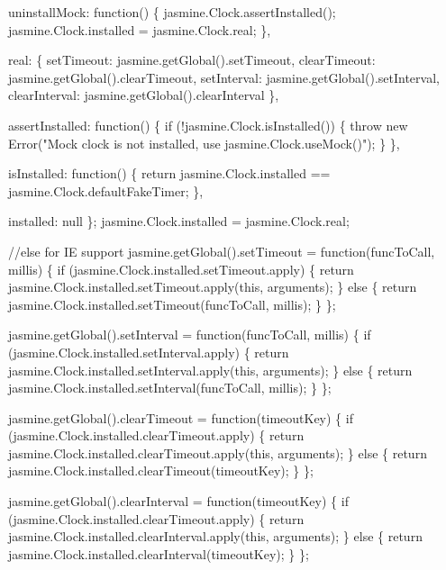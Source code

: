 \begin{DoxyCodeInclude}
  uninstallMock: \textcolor{keyword}{function}() \{
    jasmine.Clock.assertInstalled();
    jasmine.Clock.installed = jasmine.Clock.real;
  \},

  real: \{
    setTimeout: jasmine.getGlobal().setTimeout,
    clearTimeout: jasmine.getGlobal().clearTimeout,
    setInterval: jasmine.getGlobal().setInterval,
    clearInterval: jasmine.getGlobal().clearInterval
  \},

  assertInstalled: \textcolor{keyword}{function}() \{
    \textcolor{keywordflow}{if} (!jasmine.Clock.isInstalled()) \{
      \textcolor{keywordflow}{throw} \textcolor{keyword}{new} Error(\textcolor{stringliteral}{"Mock clock is not installed, use jasmine.Clock.useMock()"});
    \}
  \},

  isInstalled: \textcolor{keyword}{function}() \{
    \textcolor{keywordflow}{return} jasmine.Clock.installed == jasmine.Clock.defaultFakeTimer;
  \},

  installed: null
\};
jasmine.Clock.installed = jasmine.Clock.real;

\textcolor{comment}{//else for IE support}
jasmine.getGlobal().setTimeout = \textcolor{keyword}{function}(funcToCall, millis) \{
  \textcolor{keywordflow}{if} (jasmine.Clock.installed.setTimeout.apply) \{
    \textcolor{keywordflow}{return} jasmine.Clock.installed.setTimeout.apply(\textcolor{keyword}{this}, arguments);
  \} \textcolor{keywordflow}{else} \{
    \textcolor{keywordflow}{return} jasmine.Clock.installed.setTimeout(funcToCall, millis);
  \}
\};

jasmine.getGlobal().setInterval = \textcolor{keyword}{function}(funcToCall, millis) \{
  \textcolor{keywordflow}{if} (jasmine.Clock.installed.setInterval.apply) \{
    \textcolor{keywordflow}{return} jasmine.Clock.installed.setInterval.apply(\textcolor{keyword}{this}, arguments);
  \} \textcolor{keywordflow}{else} \{
    \textcolor{keywordflow}{return} jasmine.Clock.installed.setInterval(funcToCall, millis);
  \}
\};

jasmine.getGlobal().clearTimeout = \textcolor{keyword}{function}(timeoutKey) \{
  \textcolor{keywordflow}{if} (jasmine.Clock.installed.clearTimeout.apply) \{
    \textcolor{keywordflow}{return} jasmine.Clock.installed.clearTimeout.apply(\textcolor{keyword}{this}, arguments);
  \} \textcolor{keywordflow}{else} \{
    \textcolor{keywordflow}{return} jasmine.Clock.installed.clearTimeout(timeoutKey);
  \}
\};

jasmine.getGlobal().clearInterval = \textcolor{keyword}{function}(timeoutKey) \{
  \textcolor{keywordflow}{if} (jasmine.Clock.installed.clearTimeout.apply) \{
    \textcolor{keywordflow}{return} jasmine.Clock.installed.clearInterval.apply(\textcolor{keyword}{this}, arguments);
  \} \textcolor{keywordflow}{else} \{
    \textcolor{keywordflow}{return} jasmine.Clock.installed.clearInterval(timeoutKey);
  \}
\};


\end{DoxyCodeInclude}
